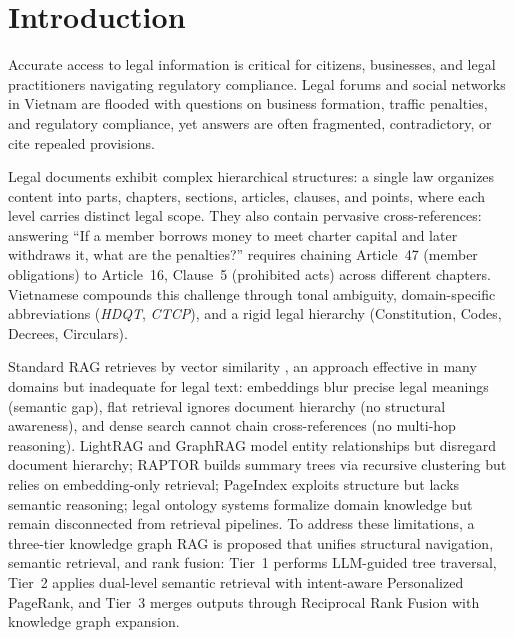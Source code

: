 \documentclass{IOS-Book-Article}
\begin{document}
\section{Introduction}

Accurate access to legal information is critical for citizens, businesses, and legal practitioners navigating regulatory compliance. Legal forums and social networks in Vietnam are flooded with questions on business formation, traffic penalties, and regulatory compliance, yet answers are often fragmented, contradictory, or cite repealed provisions.

Legal documents exhibit complex hierarchical structures: a single law organizes content into parts, chapters, sections, articles, clauses, and points, where each level carries distinct legal scope. They also contain pervasive cross-references: answering ``If a member borrows money to meet charter capital and later withdraws it, what are the penalties?'' requires chaining Article~47 (member obligations) to Article~16, Clause~5 (prohibited acts) across different chapters. Vietnamese compounds this challenge through tonal ambiguity, domain-specific abbreviations (\textit{HDQT}, \textit{CTCP}), and a rigid legal hierarchy (Constitution, Codes, Decrees, Circulars).

Standard RAG \cite{r1} retrieves by vector similarity \cite{r2}, an approach effective in many domains \cite{r4} but inadequate for legal text: embeddings blur precise legal meanings (semantic gap), flat retrieval ignores document hierarchy (no structural awareness), and dense search cannot chain cross-references (no multi-hop reasoning). LightRAG \cite{r5} and GraphRAG \cite{r6} model entity relationships but disregard document hierarchy; RAPTOR \cite{r29} builds summary trees via recursive clustering but relies on embedding-only retrieval; PageIndex \cite{r7} exploits structure but lacks semantic reasoning; legal ontology systems \cite{r8,r9} formalize domain knowledge but remain disconnected from retrieval pipelines. To address these limitations, a three-tier knowledge graph RAG is proposed that unifies structural navigation, semantic retrieval, and rank fusion: Tier~1 performs LLM-guided tree traversal, Tier~2 applies dual-level semantic retrieval with intent-aware Personalized PageRank, and Tier~3 merges outputs through Reciprocal Rank Fusion with knowledge graph expansion.
\end{document}
